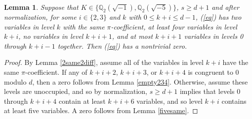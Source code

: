 \documentclass[12pt]{amsart}
\newtheorem{lemma}{Lemma}
\begin{document}
\begin{lemma} \label{threeoh}
Suppose that $K \in \{\mathbb{Q}_2(\sqrt{-1}), \mathbb{Q}_2(\sqrt{-5})\}$, $s \ge d+1$ and after normalization, for some $i \in \{2,3\}$ and $k$ with $0 \le k+i \le d-1$, (\ref{eq}) has two variables in level $k$ with the same $\pi$-coefficient, at least four variables in level $k+i$, no variables in level $k+i + 1$, and at most $k+i+1$ variables in levels 0 through $k+i-1$ together.  Then (\ref{eq}) has a nontrivial zero.
\end{lemma}
\begin{proof}
By Lemma \ref{2same2diff}, assume all of the variables in level $k+i$ have the same $\pi$-coefficient.  If any of $k+i+2$, $k+i+3$, or $k+i+4$ is congruent to 0 modulo $d$, then a zero follows from Lemma \ref{empty234}.  Otherwise, assume these levels are unoccupied, and so by normalization, $s \ge d+1$ implies that levels 0 through $k+i+4$ contain at least $k+i+6$ variables, and so level $k+i$ contains at least five variables.  A zero follows from Lemma \ref{fivesame}.
\end{proof}
\end{document}
